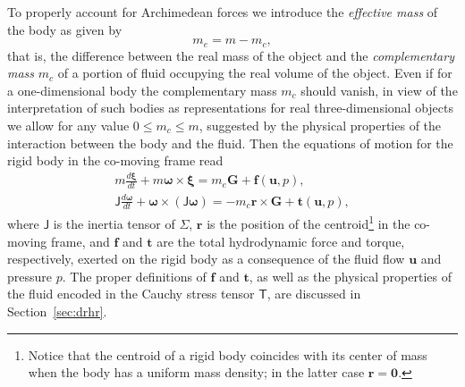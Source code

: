 \documentclass[final]{amsart}
\theoremstyle{definition}
\theoremstyle{definition}
\theoremstyle{remark}
\begin{document}
To properly account for Archimedean forces we introduce the {\em
  effective mass} of the body as given by
\[
m_e=m-m_c,
\]
that is, the difference between the real mass of the object and the
{\em complementary mass} $m_c$ of a portion of fluid occupying the
real volume of the object. Even if for a one-dimensional body the
complementary mass $m_c$ should vanish, in view of the interpretation
of such bodies as representations for real
three-dimensional objects we allow for any value $0\leq m_c\leq m$,
suggested by the physical properties of the interaction between the
body and the fluid. Then the equations of motion for the rigid body in
the co-moving frame read
\begin{gather}\label{eq:linmom}
m\frac{d{\boldsymbol \xi}}{dt}+m{\boldsymbol \omega}\times{\boldsymbol \xi}=m_e{\boldsymbol G}+{\boldsymbol f}({\boldsymbol u},p),\\
\label{eq:angmom}
{\mathsf J}\frac{d{\boldsymbol \omega}}{dt}+{\boldsymbol \omega}\times({\mathsf J}{\boldsymbol \omega})=
-m_c{\boldsymbol r}\times{\boldsymbol G}+{\boldsymbol t}({\boldsymbol u},p),
\end{gather}
where ${\mathsf J}$ is the inertia tensor of ${\Sigma}$, ${\boldsymbol r}$ is the position
of the centroid\footnote{Notice that the centroid of a rigid body
  coincides with its center of mass when the body has a uniform mass
  density; in the latter case ${\boldsymbol r}={\boldsymbol 0}$.} in the co-moving frame,
and ${\boldsymbol f}$ and ${\boldsymbol t}$ are the total hydrodynamic force and torque,
respectively, exerted on the rigid body as a consequence of the fluid
flow ${\boldsymbol u}$ and pressure $p$. The proper definitions of ${\boldsymbol f}$ and
${\boldsymbol t}$, as well as the physical properties of the fluid
encoded in the Cauchy stress tensor ${\mathsf T}$, are discussed in
Section~\ref{sec:drhr}.
\end{document}
